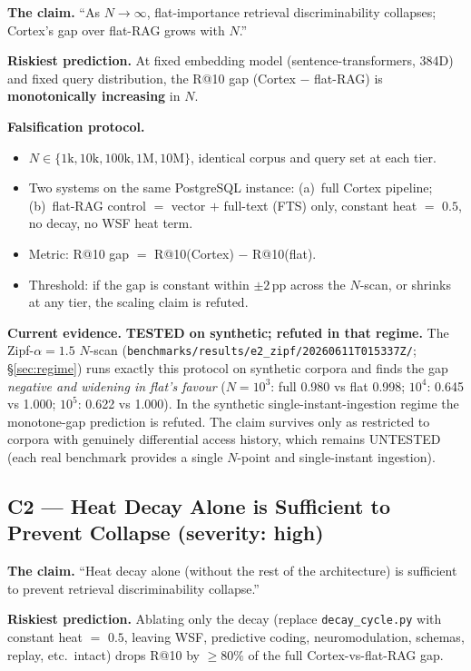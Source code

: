 \documentclass[11pt]{article}
\begin{document}
\textbf{The claim.} ``As $N \to \infty$, flat-importance retrieval
discriminability collapses; Cortex's gap over flat-RAG grows with
$N$.''

\textbf{Riskiest prediction.}  At fixed embedding model
(sentence-transformers, 384D) and fixed query distribution, the
R@10 gap (Cortex $-$ flat-RAG) is \textbf{monotonically increasing}
in $N$.

\textbf{Falsification protocol.}
\begin{itemize}
  \item $N \in \{1\mathrm{k}, 10\mathrm{k}, 100\mathrm{k},
        1\mathrm{M}, 10\mathrm{M}\}$, identical corpus and query
        set at each tier.
  \item Two systems on the same PostgreSQL instance:
        (a)~full Cortex pipeline; (b)~flat-RAG control $=$
        vector $+$ full-text (FTS) only, constant heat $=$ $0.5$,
        no decay, no WSF heat term.
  \item Metric: R@10 gap $=$ R@10(Cortex) $-$ R@10(flat).
  \item Threshold: if the gap is constant within $\pm 2$\,pp
        across the $N$-scan, or shrinks at any tier, the scaling
        claim is refuted.
\end{itemize}

\textbf{Current evidence.} \textbf{TESTED on synthetic; refuted in
that regime.}  The Zipf-$\alpha{=}1.5$ $N$-scan
(\texttt{benchmarks/results/e2\_zipf/20260611T015337Z/};
\S\ref{sec:regime}) runs exactly this protocol on synthetic corpora
and finds the gap \emph{negative and widening in flat's favour}
($N{=}10^3$: full 0.980 vs flat 0.998; $10^4$: 0.645 vs 1.000;
$10^5$: 0.622 vs 1.000).  In the synthetic single-instant-ingestion
regime the monotone-gap prediction is refuted.  The claim survives
only as restricted to corpora with genuinely differential access
history, which remains UNTESTED (each real benchmark provides a
single $N$-point and single-instant ingestion).

\subsection{C2 --- Heat Decay Alone is Sufficient to Prevent Collapse (severity: high)}
\label{app:popper-c2}

\textbf{The claim.} ``Heat decay alone (without the rest of the
architecture) is sufficient to prevent retrieval discriminability
collapse.''

\textbf{Riskiest prediction.}  Ablating only the decay (replace
\texttt{decay\_cycle.py} with constant heat $=$ $0.5$, leaving WSF,
predictive coding, neuromodulation, schemas, replay, etc.\ intact)
drops R@10 by $\ge 80\%$ of the full Cortex-vs-flat-RAG gap.
\end{document}
